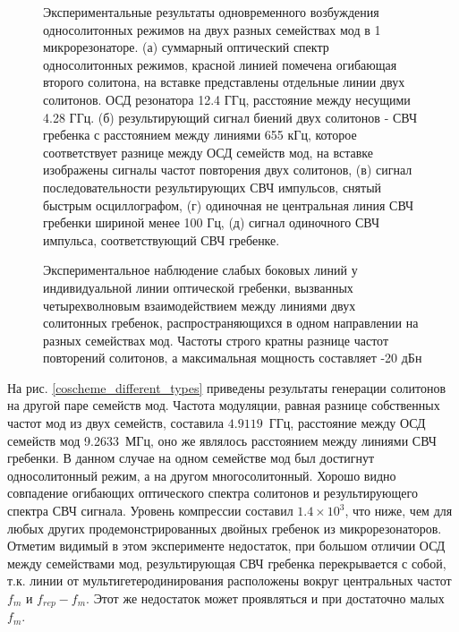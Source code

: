 \begin{figure}[!htb]
\begin{minipage}{1\linewidth}
\end{minipage}
\caption{Экспериментальные результаты одновременного возбуждения односолитонных режимов на двух разных семействах мод в 1 микрорезонаторе. (а) суммарный оптический спектр односолитонных режимов, красной линией помечена огибающая второго солитона, на вставке представлены отдельные линии двух солитонов. ОСД резонатора 12.4 ГГц, расстояние между несущими 4.28 ГГц. (б) результирующий сигнал биений двух солитонов - СВЧ гребенка с расстоянием между линиями 655 кГц, которое соответствует разнице между ОСД семейств мод, на вставке изображены сигналы частот повторения двух солитонов, (в) сигнал последовательности результирующих СВЧ импульсов, снятый быстрым осциллографом, (г) одиночная не центральная линия СВЧ гребенки шириной менее 100 Гц, (д) сигнал одиночного СВЧ импульса, соответствующий СВЧ гребенке.}
\label{Co_Scheme_results}
\end{figure}

\begin{figure}[!htb]
\begin{minipage}{1\linewidth}
\end{minipage}
\caption{Экспериментальное наблюдение слабых боковых линий у индивидуальной линии оптической гребенки, вызванных четырехволновым взаимодействием между линиями двух солитонных гребенок, распространяющихся в одном направлении на разных семействах мод. Частоты строго кратны разнице частот повторений солитонов, а максимальная мощность составляет -20 дБн}
\label{fig4_intermodulation}
\end{figure}

На рис. \ref{coscheme_different_types} приведены результаты генерации солитонов на другой паре семейств мод. Частота модуляции, равная разнице собственных частот мод из двух семейств, составила $4.9119$~ГГц, расстояние между ОСД семейств мод 9.2633~МГц, оно же являлось расстоянием между линиями СВЧ гребенки. В данном случае на одном семействе мод был достигнут односолитонный режим, а на другом многосолитонный. Хорошо видно совпадение огибающих оптического спектра солитонов и результирующего спектра СВЧ сигнала. Уровень компрессии составил $1.4\times10^3$, что ниже, чем для любых других продемонстрированных двойных гребенок из микрорезонаторов. Отметим видимый в этом эксперименте недостаток, при большом отличии ОСД между семействами мод, результирующая СВЧ гребенка перекрывается с собой, т.к. линии от мультигетеродинирования расположены вокруг центральных частот $f_m$ и $f_{rep}-f_m$. Этот же недостаток может проявляться и при достаточно малых $f_m$.

